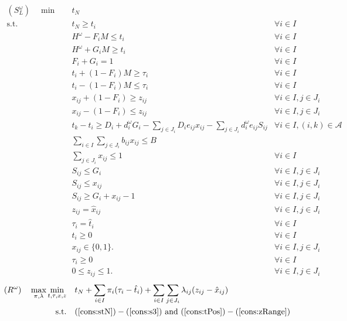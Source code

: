 \documentclass[11pt]{article}
\begin{document}
	\begin{subequations}
		\label{prob:subLocal}
		\begin{align}
		(S^\omega_L) \quad \min \quad & t_N & \\
		\text{s.t.} \quad & t_N \geq t_i & \forall i \in I \label{cons:stN}\\
		& H^\omega - F_i M \leq t_i & \forall i \in I \\
		& H^\omega + G_i M \geq t_i & \forall i \in I \\
		& F_i + G_i = 1 & \forall i \in I \\
		& t_i + (1-F_i) M \geq \tau_i & \forall i \in I\\
		& t_i - (1-F_i) M \leq \tau_i & \forall i \in I \\
		& x_{ij} + (1-F_i) \geq z_{ij} & \forall i \in I, j \in J_i \\
		& x_{ij} - (1-F_i) \leq z_{ij} & \forall i \in I, j \in J_i \\
		& t_k - t_i \geq D_i + d_i^\omega G_i -\sum_{j \in J_i} D_i e_{ij} x_{ij} - \sum_{j \in J_i} d_i^\omega e_{ij} S_{ij} & \forall i \in I, (i,k) \in \mathcal{A}\\
		&\sum_{i \in I} \sum_{j \in J_i} b_{ij} x_{ij} \leq B &\\
		& \sum_{j \in J_i} x_{ij} \leq 1 & \forall i \in I\\
		& S_{ij} \leq G_i & \forall i \in I, j \in J_i \\
		& S_{ij} \leq x_{ij} & \forall i \in I, j \in J_i\\
		& S_{ij} \geq G_i + x_{ij} - 1 & \forall i \in I, j \in J_i \label{cons:s3}\\
		& z_{ij} = \hat{x}_{ij} & \forall i \in I, j \in J_i \label{cons:local1}\\
		& \tau_{i} = \hat{t}_{i} & \forall i \in I \label{cons:local2}\\
		& t_i \geq 0 & \forall i \in I \label{cons:tPos}\\
		& x_{ij} \in \{0,1\}. & \forall i \in I, j \in J_i\\
		& \tau_i \geq 0 & \forall i \in I \\
		& 0 \leq z_{ij} \leq 1 . & \forall i \in I, j \in J_i \label{cons:zRange}
		\end{align}
	\end{subequations}
	\begin{subequations}
		\label{prob:LagDual}
		\begin{align}
		(R^\omega) \quad \max_{\pi,\lambda} \min_{t,\tau,x,z} \quad & t_N + \sum_{i \in I} \pi_i(\tau_{i} - \hat{t}_i) + \sum_{i \in I} \sum_{j \in J_i} \lambda_{ij}(z_{ij} - \hat{x}_{ij}) & \\
		\text{s.t.} \quad & (\ref{cons:stN}) - (\ref{cons:s3})\text{ and } (\ref{cons:tPos}) - (\ref{cons:zRange}) \label{cons:X}
		\end{align}
	\end{subequations}
\end{document}
